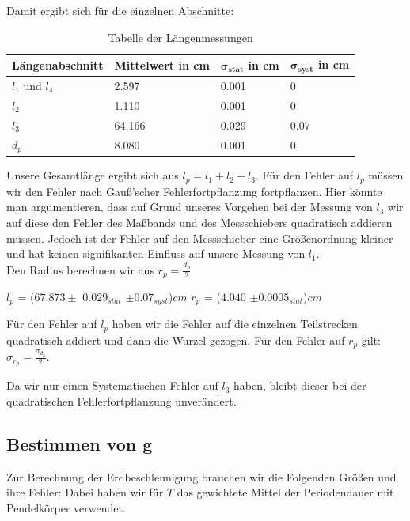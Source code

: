 \documentclass[twoside]{protokoll}
\begin{document}
Damit ergibt sich für die einzelnen Abschnitte:

\begin{table}[H]
        \centering
        \begin{tabularx}{1.0\textwidth}{X X X X} %
            \toprule
            \textbf{Längenabschnitt} & \textbf{Mittelwert in cm} & $\mathbf{\sigma_{stat}}$ in cm & $\mathbf{\sigma_{syst}}$ in cm\\
            \midrule
            $l_1$ und $l_4$ & 2.597 & 0.001 & 0 \\
            $l_2$ & 1.110 & 0.001 & 0\\
            $l_3$ & 64.166 & 0.029 & 0.07\\
            $d_p$ & 8.080 & 0.001 & 0\\
            \bottomrule
        \end{tabularx}
        \caption{Tabelle der Längenmessungen}
        \label{tab:längen un fehler}
    \end{table}

Unsere Gesamtlänge ergibt sich aus $l_p = l_1 + l_2 + l_3$. Für den Fehler auf $l_p$ müssen wir den Fehler nach Gauß'scher Fehlerfortpflanzung fortpflanzen. 
Hier könnte man argumentieren, dass auf Grund unseres Vorgehen bei der Messung von $l_3$ wir auf diese den Fehler des Maßbands und des Messschiebers quadratisch addieren müssen.
Jedoch ist der Fehler auf den Messschieber eine Größenordnung kleiner und hat keinen signifikanten Einfluss auf unsere Messung von $l_1$.\\
Den Radius berechnen wir aus $r_p = \frac{d_p}{2}$
\begin{center}
$l_p$ = ($67.873 \pm$ $0.029_{stat}$ $\pm 0.07_{syst}$)$cm$   \qquad $r_p$ = ($4.040$ $\pm 0.0005_{stat}$)$cm$
\end{center}

Für den Fehler auf $l_p$ haben wir die Fehler auf die einzelnen Teilstrecken quadratisch addiert und dann die Wurzel gezogen.
Für den Fehler auf $r_p$  gilt: $\sigma_{r_p} =\frac{\sigma_{d_p}}{2}$.

Da wir nur einen Systematischen Fehler auf $l_3$ haben, bleibt dieser bei der quadratischen Fehlerfortpflanzung unverändert.

\subsection{Bestimmen von g}

Zur Berechnung der Erdbeschleunigung brauchen wir die Folgenden Größen und ihre Fehler:
Dabei haben wir für $T$ das gewichtete Mittel der Periodendauer mit Pendelkörper verwendet.
 
\end{document}
